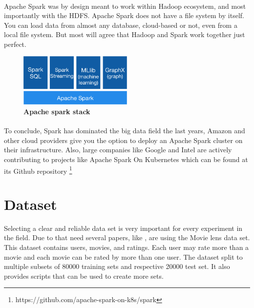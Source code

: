 \paragraph{}Apache Spark was by design meant to work within Hadoop ecosystem, and most importantly with the HDFS. Apache Spark does not have a file system by itself. You can load data from almost any database, cloud-based or not, even from a local file system. But most will agree that Hadoop and Spark work together just perfect. \\

\begin{figure}[ht]
	\centering
	\includegraphics[width=0.5\textwidth]{../images/spark-stack.png}
	\caption{\bfseries Apache spark stack \cite{ApacheSpark:1}}
	\label{apacheSparkStack}
\end{figure}

\paragraph{} To conclude, Spark has dominated the big data field the last years, Amazon and other cloud providers give you the option to deploy an Apache Spark cluster on their infrastructure. Also, large companies like Google and Intel are actively contributing to projects like Apache Spark On Kubernetes which can be found at its Github repository \footnote{https://github.com/apache-spark-on-k8s/spark}

\section{Dataset}
\paragraph{}Selecting a clear and reliable data set is very important for every experiment in the field. Due to that need several papers, like \cite{levandoski2011recbench}, are using the Movie lens data set. This dataset contains users, movies, and ratings. Each user may rate more than a movie and each movie can be rated by more than one user. The dataset split to multiple subsets of 80000 training sets and respective 20000 test set. It also provides scripts that can be used to create more sets.


